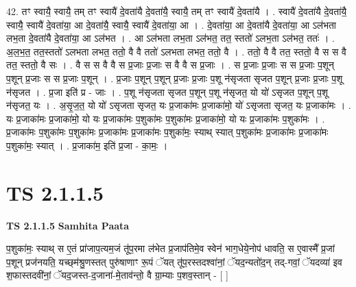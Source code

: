 \documentclass[17pt]{extarticle}
\begin{document}
42. तꣳ स्वायै॒ स्वायै॒ तम् तꣳ स्वायै॑ दे॒वता॑यै दे॒वता॑यै॒ स्वायै॒ तम् तꣳ स्वायै॑ दे॒वता॑यै । . स्वायै॑ दे॒वता॑यै दे॒वता॑यै॒ स्वायै॒ स्वायै॑ दे॒वता॑या॒ आ दे॒वता॑यै॒ स्वायै॒ स्वायै॑ दे॒वता॑या॒ आ । . दे॒वता॑या॒ आ दे॒वता॑यै दे॒वता॑या॒ आ ऽल॑भता लभ॒ता दे॒वता॑यै दे॒वता॑या॒ आ ऽल॑भत । . आ ऽल॑भता लभ॒ता ऽल॑भत॒ तत॒ स्ततो॑ ऽलभ॒ता ऽल॑भत॒ ततः॑ । . अ॒ल॒भ॒त॒ तत॒स्ततो॑ ऽलभता लभत॒ ततो॒ वै वै ततो॑ ऽलभता लभत॒ ततो॒ वै । . ततो॒ वै वै तत॒ स्ततो॒ वै स स वै तत॒ स्ततो॒ वै सः । . वै स स वै वै स प्र॒जाः प्र॒जाः स वै वै स प्र॒जाः । . स प्र॒जाः प्र॒जाः स स प्र॒जाः प॒शून् प॒शून् प्र॒जाः स स प्र॒जाः प॒शून् । . प्र॒जाः प॒शून् प॒शून् प्र॒जाः प्र॒जाः प॒शू न॑सृजता सृजत प॒शून् प्र॒जाः प्र॒जाः प॒शू न॑सृजत । . प्र॒जा इति॑ प्र - जाः । . प॒शू न॑सृजता सृजत प॒शून् प॒शू न॑सृजत॒ यो यो॑ ऽसृजत प॒शून् प॒शू न॑सृजत॒ यः । . अ॒सृ॒ज॒त॒ यो यो॑ ऽसृजता सृजत॒ यः प्र॒जाका॑मः प्र॒जाका॑मो॒ यो॑ ऽसृजता सृजत॒ यः प्र॒जाका॑मः । . यः प्र॒जाका॑मः प्र॒जाका॑मो॒ यो यः प्र॒जाका॑मः प॒शुका॑मः प॒शुका॑मः प्र॒जाका॑मो॒ यो यः प्र॒जाका॑मः प॒शुका॑मः । . प्र॒जाका॑मः प॒शुका॑मः प॒शुका॑मः प्र॒जाका॑मः प्र॒जाका॑मः प॒शुका॑मः॒ स्याथ् स्यात् प॒शुका॑मः प्र॒जाका॑मः प्र॒जाका॑मः प॒शुका॑मः॒ स्यात् । . प्र॒जाका॑म॒ इति॑ प्र॒जा - का॒मः॒ । \newline
\pagebreak
{}

\section{ TS 2.1.1.5 }

\textbf{TS 2.1.1.5 } \newline
\textbf{Samhita Paata} \newline

प॒शुका॑मः॒ स्याथ् स ए॒तं प्रा॑जाप॒त्यम॒जं तू॑प॒रमा ल॑भेत प्र॒जाप॑तिमे॒व स्वेन॑ भाग॒धेये॒नोप॑ धावति॒ स ए॒वास्मै᳚ प्र॒जां प॒शून् प्रज॑नयति॒ यच्छ्‌म॑श्रु॒णस्तत् पुरु॑षाणाꣳ रू॒पं ॅयत् तू॑प॒रस्तदश्वा॑नां॒ ॅयद॒न्यतो॑द॒न् तद्-गवां॒ ॅयदव्या॑ इव श॒फास्तदवी॑नां॒ ॅयद॒जस्त-द॒जाना॑-मे॒ताव॑न्तो॒ वै ग्रा॒म्याः प॒शव॒स्तान् - [  ] \newline
\end{document}

